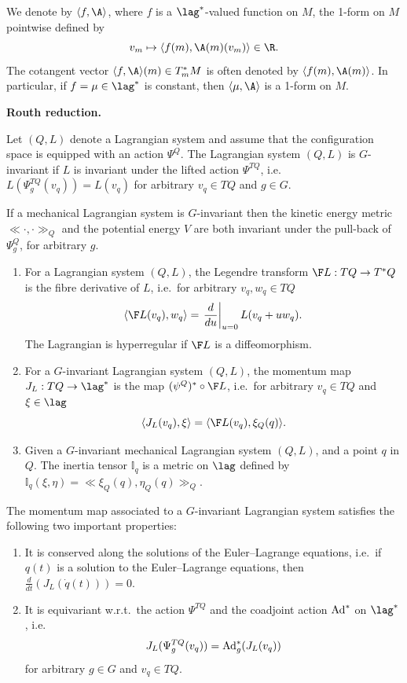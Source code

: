We denote by $\langle f ,\A\rangle$, where $f$ is a $\lag^*$-valued function on $M$,  the 1-form on $M$ pointwise def\/ined by \[v_m\mapsto \langle f(m),\A(m)(v_m)\rangle\in \R.\] The cotangent vector $\langle f ,\A\rangle(m)\in T_m^*M$ is often denoted by $\langle f(m),\A(m)\rangle$.  In particular, if $f=\mu\in\lag^*$ is constant, then $\langle \mu,\A\rangle$ is a 1-form on $M$.

{\bf Routh reduction.}

\begin{definition} Let $(Q,L)$ denote a Lagrangian system and assume that the conf\/iguration space is equipped with an action $\Psi^Q$. The Lagrangian system $(Q,L)$ is $G$-invariant if $L$ is invariant under the lifted action $\Psi^{TQ}$, i.e.\ $L(\Psi^{TQ}_g(v_q))=L(v_q)$ for arbitrary $v_q\in TQ$ and $g\in G$.
\end{definition}

If a mechanical Lagrangian system is $G$-invariant then the kinetic energy metric $\ll \cdot, \cdot \gg_Q$ and the potential energy $V$ are both invariant under the pull-back of $\Psi^Q_g$, for arbitrary $g$.

\begin{definition}\mbox{}
\begin{enumerate}\itemsep=0pt
\item For a Lagrangian system $(Q,L)$, the Legendre transform $\F L:TQ\to T^*Q$ is the f\/ibre derivative of $L$, i.e.\ for arbitrary $v_q,w_q\in TQ$
\[\langle \F L(v_q), w_q\rangle  = \left.\frac{d}{du}\right|_{u=0} L(v_q+u w_q).\]
The Lagrangian is hyperregular if $\F L$ is a dif\/feomorphism.
\item For a $G$-invariant Lagrangian system $(Q,L)$, the momentum map $J_L : TQ\to \lag^*$ is the map $(\psi^Q)^*\circ \F L$, i.e.\ for arbitrary  $v_q\in TQ$ and $\xi \in \lag$
\[\langle J_L(v_q),\xi\rangle = \langle \F L(v_q) , \xi_{Q}(q)\rangle.\]
\item Given a $G$-invariant mechanical Lagrangian system $(Q,L)$, and a point $q$ in $Q$. The inertia tensor $\mathbb{I}_q$ is a metric on $\lag$ def\/ined by $\mathbb{I}_q(\xi,\eta)= \ll \xi_Q(q),\eta_Q(q)\gg_Q$.
\end{enumerate}
\end{definition}
The momentum map associated to a $G$-invariant Lagrangian system satisf\/ies the following two important properties:
\begin{enumerate}\itemsep=0pt \item It is conserved along the solutions of the Euler--Lagrange equations, i.e.\ if $q(t)$ is a solution to the Euler--Lagrange equations, then $\frac{d}{dt} \left(J_L(\dot q(t))\right)=0$.
\item It is equivariant w.r.t.\ the action $\Psi^{TQ}$ and the coadjoint action ${\rm Ad}^*$ on $\lag^*$, i.e.\ \[J_L(\Psi^{TQ}_g(v_q)) = {\rm Ad}^*_g(J_L(v_q))\] for arbitrary $g\in G$ and $v_q\in TQ$.
\end{enumerate}

